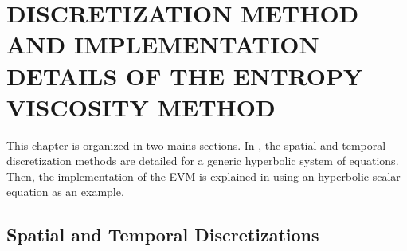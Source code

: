 %
%
%

\chapter{\uppercase {Discretization method and implementation details of the entropy viscosity method}}\label{chap:disc_chap2}
This chapter is organized in two mains sections. In , the spatial and temporal discretization methods are detailed for a generic hyperbolic system of equations. Then, the implementation of the EVM is explained in  using an hyperbolic scalar equation as an example. 

\section{Spatial and Temporal Discretizations}\label{sec:disc_sect2}
%
